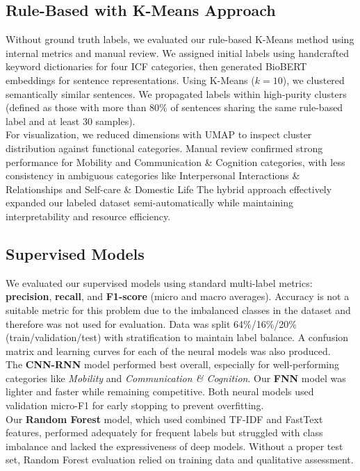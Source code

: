 \subsection{Rule-Based with K-Means Approach}

Without ground truth labels, we evaluated our rule-based K-Means method using internal metrics and manual review. We assigned initial labels using handcrafted keyword dictionaries for four ICF categories, then generated BioBERT embeddings for sentence representations. Using K-Means ($k=10$), we clustered semantically similar sentences. We propagated labels within high-purity clusters (defined as those with more than 80\% of sentences sharing the same rule-based label and at least 30 samples). \\

For visualization, we reduced dimensions with UMAP to inspect cluster distribution against functional categories. Manual review confirmed strong performance for Mobility and Communication \& Cognition categories, with less consistency in ambiguous categories like Interpersonal Interactions \& Relationships and Self-care \& Domestic Life The hybrid approach effectively expanded our labeled dataset semi-automatically while maintaining interpretability and resource efficiency.


\subsection{Supervised Models}

We evaluated our supervised models using standard multi-label metrics: \textbf{precision}, \textbf{recall}, and \textbf{F1-score} (micro and macro averages). Accuracy is not a suitable metric for this problem due to the imbalanced classes in the dataset and therefore was not used for evaluation. Data was split 64\%/16\%/20\% (train/validation/test) with stratification to maintain label balance. A confusion matrix and learning curves for each of the neural models was also produced. \\

The \textbf{CNN-RNN} model performed best overall, especially for well-performing categories like \textit{Mobility} and \textit{Communication \& Cognition}. Our \textbf{FNN} model was lighter and faster while remaining competitive. Both neural models used validation micro-F1 for early stopping to prevent overfitting.\\

Our \textbf{Random Forest} model, which used combined TF-IDF and FastText features, performed adequately for frequent labels but struggled with class imbalance and lacked the expressiveness of deep models. Without a proper test set, Random Forest evaluation relied on training data and qualitative assessment.
